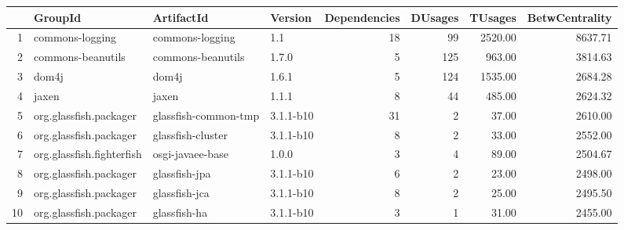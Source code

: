 \begin{table}[ht]
\centering
\begin{tabular}{rlllrrrr}
  \hline
 & GroupId & ArtifactId & Version & Dependencies & DUsages & TUsages & BetwCentrality \\ 
  \hline
1 & commons-logging & commons-logging & 1.1 &  18 &  99 & 2520.00 & 8637.71 \\ 
  2 & commons-beanutils & commons-beanutils & 1.7.0 &   5 & 125 & 963.00 & 3814.63 \\ 
  3 & dom4j & dom4j & 1.6.1 &   5 & 124 & 1535.00 & 2684.28 \\ 
  4 & jaxen & jaxen & 1.1.1 &   8 &  44 & 485.00 & 2624.32 \\ 
  5 & org.glassfish.packager & glassfish-common-tmp & 3.1.1-b10 &  31 &   2 & 37.00 & 2610.00 \\ 
  6 & org.glassfish.packager & glassfish-cluster & 3.1.1-b10 &   8 &   2 & 33.00 & 2552.00 \\ 
  7 & org.glassfish.fighterfish & osgi-javaee-base & 1.0.0 &   3 &   4 & 89.00 & 2504.67 \\ 
  8 & org.glassfish.packager & glassfish-jpa & 3.1.1-b10 &   6 &   2 & 23.00 & 2498.00 \\ 
  9 & org.glassfish.packager & glassfish-jca & 3.1.1-b10 &   8 &   2 & 25.00 & 2495.50 \\ 
  10 & org.glassfish.packager & glassfish-ha & 3.1.1-b10 &   3 &   1 & 31.00 & 2455.00 \\ 
   \hline
\end{tabular}
\end{table}
